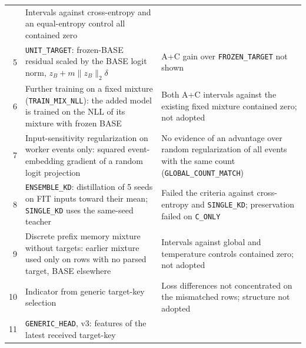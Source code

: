 {\begin{xltabular}{\textwidth}{@{}r>{\raggedright\arraybackslash}p{0.33\textwidth}>{\raggedright\arraybackslash}X@{}}
  & Intervals against cross-entropy and an equal-entropy control all
    contained zero \\
5 & \texttt{UNIT\_TARGET}: frozen-BASE residual scaled by the BASE logit
    norm, $z_B + m\lVert z_B\rVert_2\delta$
  & A+C gain over \texttt{FROZEN\_TARGET} not shown \\
6 & Further training on a fixed mixture (\texttt{TRAIN\_MIX\_NLL}): the
    added model is trained on the NLL of its mixture with frozen BASE
  & Both A+C intervals against the existing fixed mixture contained
    zero; not adopted \\
7 & Input-sensitivity regularization on worker events only: squared
    event-embedding gradient of a random logit projection
  & No evidence of an advantage over random regularization of all
    events with the same count (\texttt{GLOBAL\_COUNT\_MATCH}) \\
8 & \texttt{ENSEMBLE\_KD}: distillation of 5 seeds on FIT inputs toward
    their mean; \texttt{SINGLE\_KD} uses the same-seed teacher
  & Failed the criteria against cross-entropy and \texttt{SINGLE\_KD};
    preservation failed on \texttt{C\_ONLY} \\
9 & Discrete prefix memory mixture without targets: earlier mixture used
    only on rows with no parsed target, BASE elsewhere
  & Intervals against global and temperature controls contained zero;
    not adopted \\
10 & Indicator from generic target-key selection
  & Loss differences not concentrated on the mismatched rows; structure
    not adopted \\
11 & \texttt{GENERIC\_HEAD}, v3: features of the latest received target-key

\end{xltabular}}
